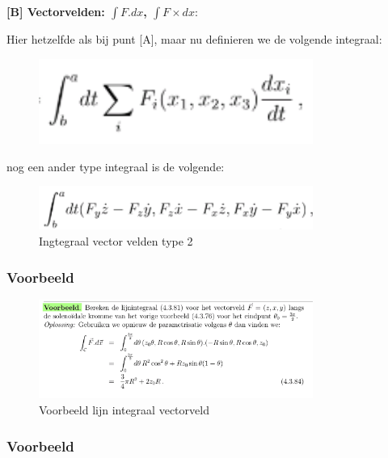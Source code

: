 \documentclass[a4paper]{report}
\begin{document}
\textbf{[B] Vectorvelden: $\int F.dx$, $\int F \times dx$}:

Hier hetzelfde als bij punt [A], maar nu definieren we de volgende integraal:


\begin{figure}[H]
	\centering
	\includegraphics[width=0.8\textwidth]{assets/integraal_vectorvelden.png}
	\caption{}
	\label{fig:integraal_vectorvelden}
\end{figure}

nog een ander type integraal is de volgende:


\begin{figure}[H]
	\centering
	\includegraphics[width=0.8\textwidth]{assets/integraal_vector_velden_cross_product.png}
	\caption{Ingtegraal vector velden type 2}
	\label{fig:integraal_vector_velden_cross_product}
\end{figure}

\subsubsection{Voorbeeld}

\begin{figure}[H]
	\centering
	\includegraphics[width=0.8\textwidth]{assets/voorbeeld_lijn_integraal_vectorveld.png}
	\caption{Voorbeeld lijn integraal vectorveld}
	\label{fig:voorbeeld_lijn_integraal_vectorveld}
\end{figure}


\subsubsection{Voorbeeld}
\end{document}
